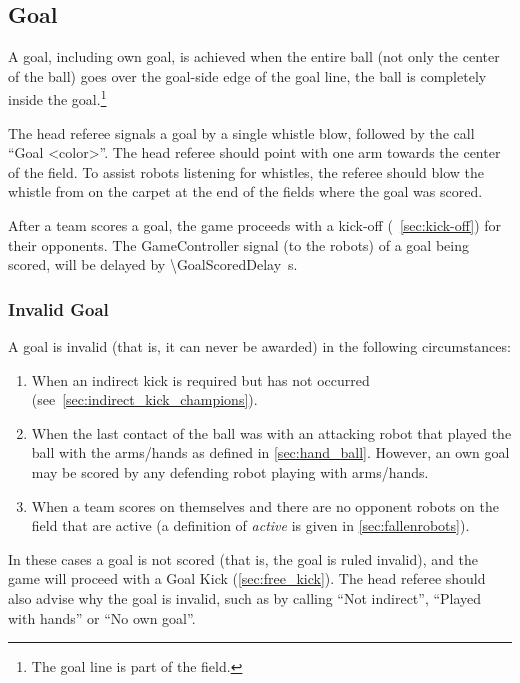 \subsection{Goal}
\label{sec:goal}

A goal, including own goal, is achieved when the entire ball (not only the center of the ball) goes over the goal-side edge of the goal line, \ie the ball is completely inside the goal.\footnote{
  The goal line is part of the field.
}

The head referee signals a goal by a single whistle blow, followed by the call ``Goal \textless color\textgreater''.
The head referee should point with one arm towards the center of the field.
To assist robots listening for whistles, the referee should blow the whistle from on the carpet at the end of the fields where the goal was scored.

After a team scores a goal, the game proceeds with a kick-off (\cf~\cref{sec:kick-off}) for their opponents.
The GameController signal (to the robots) of a goal being scored, will be delayed by \qty{\GoalScoredDelay}{\second}.

\subsubsection{Invalid Goal}
\label{sec:invalid_goal}

A goal is invalid (that is, it can never be awarded) in the following circumstances:
\begin{enumerate}
    \item When an indirect kick is required but has not occurred (see~\cref{sec:indirect_kick_champions}).
    \item When the last contact of the ball was with an attacking robot that played the ball with the arms/hands as defined in \cref{sec:hand_ball}.
      However, an own goal may be scored by any defending robot playing with arms/hands.
    \item When a team scores on themselves and there are no opponent robots on the field that are active (a definition of \emph{active} is given in \cref{sec:fallenrobots}).
\end{enumerate}

In these cases a goal is not scored (that is, the goal is ruled invalid), and the game will proceed with a Goal Kick (\cf \cref{sec:free_kick}).
The head referee should also advise why the goal is invalid, such as by calling ``Not indirect'', ``Played with hands'' or ``No own goal''.


